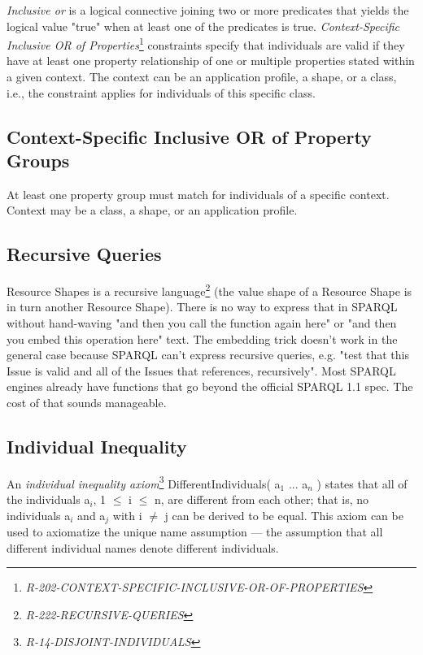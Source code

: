 \documentclass{llncs}
\begin{document}
\emph{Inclusive or} is a logical connective joining two or more predicates that yields the logical value "true" when at least one of the predicates is true.
\emph{Context-Specific Inclusive OR of Properties}\footnote{\emph{R-202-CONTEXT-SPECIFIC-INCLUSIVE-OR-OF-PROPERTIES}} constraints specify that individuals are valid if they have at least one property relationship of one or multiple properties stated within a given context.
The context can be an application profile, a shape, or a class, i.e., the constraint applies for individuals of this specific class.

\subsection{Context-Specific Inclusive OR of Property Groups}

At least one property group must match for individuals of a specific context. 
Context may be a class, a shape, or an application profile.

\subsection{Recursive Queries}

Resource Shapes is a recursive language\footnote{\emph{R-222-RECURSIVE-QUERIES}} (the value shape of a Resource Shape is in turn another Resource Shape). 
There is no way to express that in SPARQL without hand-waving "and then you call the function again here" or "and then you embed this operation here" text.  
The embedding trick doesn't work
in the general case because SPARQL can't express recursive queries,
e.g. "test that this Issue is valid and all of the Issues that references, recursively".
Most SPARQL engines already have
functions that go beyond the official SPARQL 1.1 spec. 
The cost of that sounds manageable.

\subsection{Individual Inequality}

An \emph{individual inequality axiom}\footnote{\emph{R-14-DISJOINT-INDIVIDUALS}} DifferentIndividuals( a$_1$ ... a$_n$ ) states that all of the individuals a$_i$, 1 $\leq$ i $\leq$ n, are different from each other; 
that is, no individuals a$_i$ and a$_j$ with i $\neq$ j can be derived to be equal. 
This axiom can be used to axiomatize the unique name assumption — the assumption that all different individual names denote different individuals. 
\end{document}
